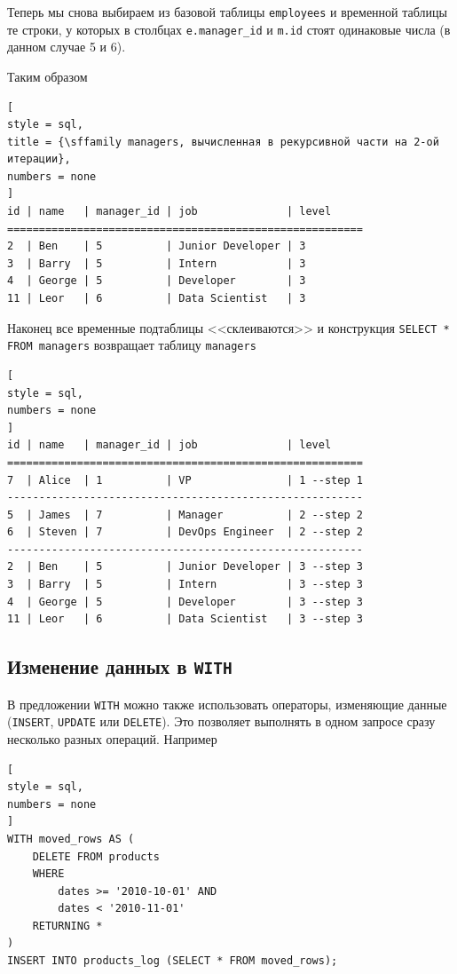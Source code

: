 \documentclass[%
	11pt,
	a4paper,
	utf8,
		]{article}
\begin{document}
Теперь мы снова выбираем из базовой таблицы \texttt{employees} и временной таблицы те строки, у которых в столбцах \texttt{e.manager\_id} и \texttt{m.id} стоят одинаковые числа (в данном случае 5 и 6).

Таким образом

\begin{lstlisting}[
style = sql,
title = {\sffamily managers, вычисленная в рекурсивной части на 2-ой итерации},
numbers = none
]
id | name   | manager_id | job              | level
========================================================
2  | Ben    | 5          | Junior Developer | 3
3  | Barry  | 5          | Intern           | 3
4  | George | 5          | Developer        | 3 
11 | Leor   | 6          | Data Scientist   | 3 
\end{lstlisting}


Наконец все временные подтаблицы <<склеиваются>> и конструкция \lstinline[style = sql]{SELECT * FROM managers} возвращает таблицу \texttt{managers}

\begin{lstlisting}[
style = sql,
numbers = none
]
id | name   | manager_id | job              | level
========================================================
7  | Alice  | 1          | VP               | 1 --step 1
--------------------------------------------------------
5  | James  | 7          | Manager          | 2 --step 2
6  | Steven | 7          | DevOps Engineer  | 2 --step 2
--------------------------------------------------------
2  | Ben    | 5          | Junior Developer | 3 --step 3
3  | Barry  | 5          | Intern           | 3 --step 3
4  | George | 5          | Developer        | 3 --step 3
11 | Leor   | 6          | Data Scientist   | 3 --step 3
\end{lstlisting}





\subsection{Изменение данных в \texttt{WITH}}

В предложении \texttt{WITH} можно также использовать операторы, изменяющие данные (\texttt{INSERT}, \texttt{UPDATE} или \texttt{DELETE}). Это позволяет выполнять в одном запросе сразу несколько разных операций. Например

\begin{lstlisting}[
style = sql,
numbers = none
]
WITH moved_rows AS (
    DELETE FROM products
    WHERE
        dates >= '2010-10-01' AND
        dates < '2010-11-01'
    RETURNING *
)
INSERT INTO products_log (SELECT * FROM moved_rows);
\end{lstlisting}
\end{document}
